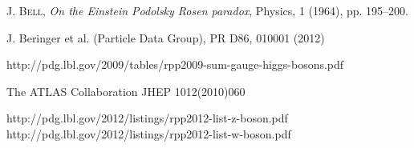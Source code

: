 \documentclass[a4paper,10pt]{article}
\begin{document}
\begin{thebibliography}{99}

     \textsc{J. Bell}, \textit{On the Einstein Podolsky Rosen paradox}, Physics, 1 (1964), pp. 195–200.

   J. Beringer et al. (Particle Data Group), PR D86, 010001 (2012)

   http://pdg.lbl.gov/2009/tables/rpp2009-sum-gauge-higgs-bosons.pdf

   The ATLAS Collaboration JHEP 1012(2010)060

   http://pdg.lbl.gov/2012/listings/rpp2012-list-z-boson.pdf
	http://pdg.lbl.gov/2012/listings/rpp2012-list-w-boson.pdf
\end{thebibliography}
\end{document}
